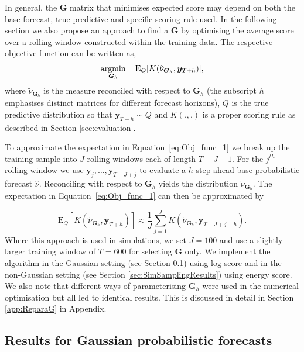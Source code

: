 \documentclass[12pt]{article}
\def\E{\text{E}}
\theoremstyle{definition}
\begin{document}
In general, the $\bm{G}$ matrix that minimises expected score may depend on both the base forecast, true predictive and specific scoring rule used.  In the following section we also propose an approach to find a $\bm{G}$ by optimising the average score over a rolling window constructed within the training data.  The respective objective function can be written as,
\begin{equation} \label{eq:Obj_func_1}
\operatornamewithlimits{argmin}_{\bm{G}_h} \quad \E_{Q}[K(\tilde{\nu}_{\bm{G}_h}, \bm{y}_{T+h})],
\end{equation}
where $\tilde{\nu}_{\bm{G}_h}$ is the measure reconciled with respect to $\bm{G}_h$ (the subscript $h$ emphasises distinct matrices for different forecast horizons), $Q$ is the true predictive distribution so that $\bm{y}_{T+h}\sim Q$ and $K(.,.)$ is a proper scoring rule as described in Section \ref{sec:evaluation}.

To approximate the expectation in Equation~\eqref{eq:Obj_func_1} we break up the training sample into $J$ rolling windows each of length $T-J+1$.  For the $j^{th}$ rolling window we use $\bm{y}_{j},\ldots,\bm{y}_{T-J+j}$ to evaluate a $h$-step ahead base probabilistic forecast $\hat{\nu}$.  Reconciling with respect to $\bm{G}_h$ yields the distribution $\tilde{\nu}_{\bm{G}_h}$.  The expectation in Equation~\eqref{eq:Obj_func_1} can then be approximated by

\begin{equation} \label{eq:Obj_func_apprx} \E_{Q}[K(\tilde{\nu}_{\bm{G}_h}, \bm{y}_{T+h})]\approx\frac{1}{J}\sum_{j=1}^{J}K(\tilde{\nu}_{\bm{G}_h},\bm{y}_{T-J+j+h}).\nonumber
\end{equation}
Where this approach is used in simulations, we set $J=100$ and use a slightly larger training window of $T=600$ for selecting $\bm{G}$ only. We implement the algorithm in the Gaussian setting (see Section \ref{sec:SimAnalysticalResults}) using log score and in the non-Gaussian setting (see Section \ref{sec:SimSamplingResults}) using energy score.  We also note that different ways of parameterising $\bm{G}_h$ were used in the numerical optimisation but all led to identical results.  This is discussed in detail in Section \ref{app:ReparaG} in Appendix.

\subsection{Results for Gaussian probabilistic forecasts}\label{sec:SimAnalysticalResults}
\end{document}
